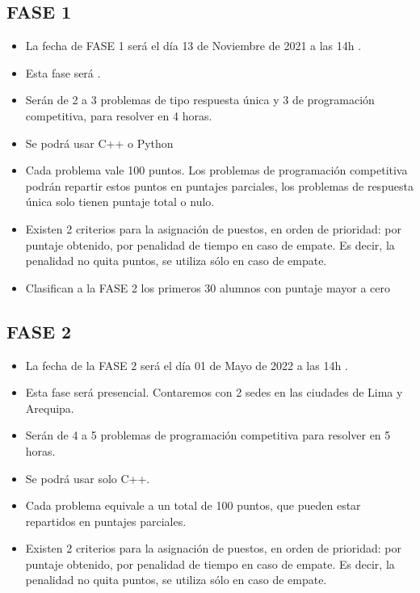 \documentclass{article}
\begin{document}
\subsection*{FASE 1}

\begin{itemize}

 \item La fecha de FASE 1 será el día {\color{red} 13 de Noviembre de 2021 a las 14h} . 
 
  \item Esta fase será {\color{red}{virtual}}.

  \item Serán de 2 a 3 problemas de tipo respuesta única  y 3 de programación competitiva, para resolver en 4 horas.
  
   \item Se podrá usar C++ o Python
   
   \item

Cada problema vale 100 puntos.
Los problemas de programación competitiva
podrán repartir estos puntos en puntajes parciales, los problemas de respuesta única solo tienen puntaje total o nulo.

 \item 
Existen 2 criterios para la asignación de puestos, en orden de prioridad: por puntaje obtenido, por penalidad de tiempo en caso de empate.
Es decir, la penalidad no quita puntos, se utiliza sólo en caso de empate.


\item Clasifican a la FASE 2 los primeros 30 alumnos con puntaje mayor a cero


\end{itemize}

\subsection*{FASE 2}

\begin{itemize}
    \item La fecha de la FASE 2 será el día {\color{red} 01 de Mayo de 2022 a las 14h} . 
    
    \item Esta fase será {\color{red}presencial}. Contaremos con 2 sedes en las ciudades de Lima y Arequipa.
    
   \item Serán de 4 a 5 problemas de programación competitiva para resolver en 5 horas.
   
 \item Se podrá usar solo C++.
   

\item

Cada problema equivale a un total de 100 puntos, que pueden estar repartidos en puntajes parciales.

 \item 
Existen 2 criterios para la asignación de puestos, en orden de prioridad: por puntaje obtenido, por penalidad de tiempo en caso de empate.
Es decir, la penalidad no quita puntos, se utiliza sólo en caso de empate.


\end{itemize}
\end{document}

